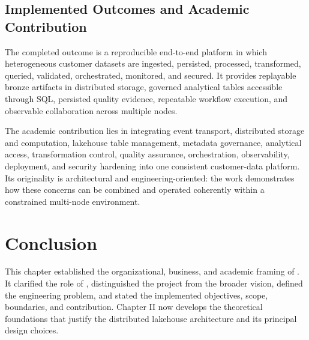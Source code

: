 \subsection{Implemented Outcomes and Academic Contribution}
The completed outcome is a reproducible end-to-end platform in which heterogeneous customer datasets are ingested, persisted, processed, transformed, queried, validated, orchestrated, monitored, and secured. It provides replayable bronze artifacts in distributed storage, governed analytical tables accessible through SQL, persisted quality evidence, repeatable workflow execution, and observable collaboration across multiple nodes.

The academic contribution lies in integrating event transport, distributed storage and computation, lakehouse table management, metadata governance, analytical access, transformation control, quality assurance, orchestration, observability, deployment, and security hardening into one consistent customer-data platform. Its originality is architectural and engineering-oriented: the work demonstrates how these concerns can be combined and operated coherently within a constrained multi-node environment.

\section{Conclusion}
This chapter established the organizational, business, and academic framing of \projectname{}. It clarified the role of \companyname{}, distinguished the project from the broader \initiative{} vision, defined the engineering problem, and stated the implemented objectives, scope, boundaries, and contribution. Chapter II now develops the theoretical foundations that justify the distributed lakehouse architecture and its principal design choices.
